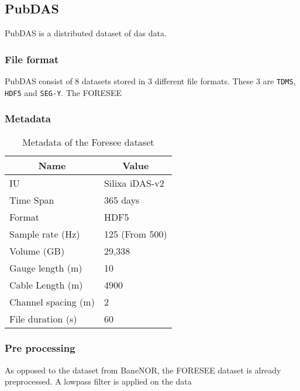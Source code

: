 \subsection{PubDAS}

PubDAS \cite{spica2023pubdas} is a distributed dataset of \acrfull{das} data. 



\subsubsection{File format}

PubDAS consist of 8 datasets stored in 3 different file formats. These 3 are \texttt{TDMS}, \texttt{HDF5} and \texttt{SEG-Y}. 
The FORESEE

\subsubsection{Metadata}

\begin{table}[h]
    \centering
    \begin{tabular}{|l|l|}
    \hline
    \multicolumn{1}{|c|}{\textbf{Name}} & \multicolumn{1}{c|}{\textbf{Value}} \\ \hline
    IU                                  & Silixa iDAS-v2                      \\ \hline
    Time Span                           & 365 days                            \\ \hline
    Format                              & HDF5                                \\ \hline
    Sample rate (Hz)                    & 125 (From 500)                      \\ \hline
    Volume (GB)                         & 29,338                              \\ \hline
    Gauge length (m)                    & 10                                  \\ \hline
    Cable Length (m)                    & 4900                                \\ \hline
    Channel spacing (m)                 & 2                                   \\ \hline
    File duration (s)                   & 60                                  \\ \hline
    \end{tabular}
    \caption{Metadata of the Foresee dataset}
    \label{tab:foresee_meta}
\end{table}

\subsubsection{Pre processing}

As opposed to the dataset from BaneNOR, the FORESEE dataset is already preprocessed. A lowpass filter is applied on the data